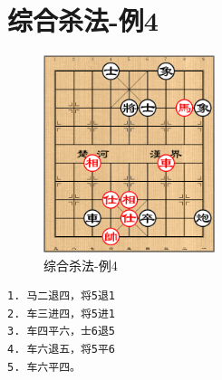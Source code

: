 \documentclass[a5paper,twoside]{book}
\begin{document}
\section{综合杀法-例4}
\label{sec-7-4}
\begin{figure}[H]
\centering
\includegraphics[width=5cm]{pic/综合杀法-例4.png}
\caption{综合杀法-例4}
\end{figure}

\begin{verbatim}
1. 马二退四，将5退1
2. 车三进四，将5进1
3. 车四平六，士6退5
4. 车六退五，将5平6
5. 车六平四。
\end{verbatim}
\end{document}
